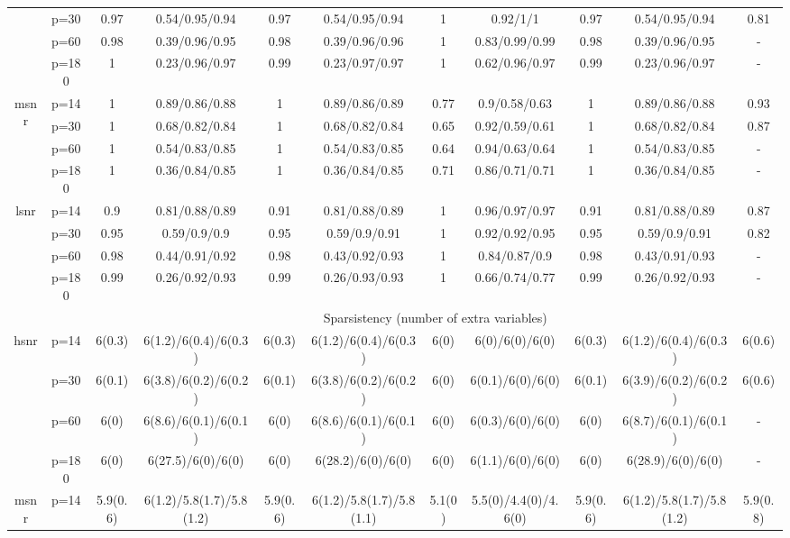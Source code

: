 \begin{table}[ht]
{\begin{tabular}{|c|c|cc|cc|cc|cc|c|}
   & p=30 & 0.97 & 0.54/0.95/0.94 & 0.97 & 0.54/0.95/0.94 & 1 & 0.92/1/1 & 0.97 & 0.54/0.95/0.94 & 0.81 \\ 
   & p=60 & 0.98 & 0.39/0.96/0.95 & 0.98 & 0.39/0.96/0.96 & 1 & 0.83/0.99/0.99 & 0.98 & 0.39/0.96/0.95 & - \\ 
   & p=180 & 1 & 0.23/0.96/0.97 & 0.99 & 0.23/0.97/0.97 & 1 & 0.62/0.96/0.97 & 0.99 & 0.23/0.96/0.97 & - \\ 
  \midrule\multirow{4}[2]{*}{msnr} & p=14 & 1 & 0.89/0.86/0.88 & 1 & 0.89/0.86/0.89 & 0.77 & 0.9/0.58/0.63 & 1 & 0.89/0.86/0.88 & 0.93 \\ 
   & p=30 & 1 & 0.68/0.82/0.84 & 1 & 0.68/0.82/0.84 & 0.65 & 0.92/0.59/0.61 & 1 & 0.68/0.82/0.84 & 0.87 \\ 
   & p=60 & 1 & 0.54/0.83/0.85 & 1 & 0.54/0.83/0.85 & 0.64 & 0.94/0.63/0.64 & 1 & 0.54/0.83/0.85 & - \\ 
   & p=180 & 1 & 0.36/0.84/0.85 & 1 & 0.36/0.84/0.85 & 0.71 & 0.86/0.71/0.71 & 1 & 0.36/0.84/0.85 & - \\ 
  \midrule\multirow{4}[2]{*}{lsnr} & p=14 & 0.9 & 0.81/0.88/0.89 & 0.91 & 0.81/0.88/0.89 & 1 & 0.96/0.97/0.97 & 0.91 & 0.81/0.88/0.89 & 0.87 \\ 
   & p=30 & 0.95 & 0.59/0.9/0.9 & 0.95 & 0.59/0.9/0.91 & 1 & 0.92/0.92/0.95 & 0.95 & 0.59/0.9/0.91 & 0.82 \\ 
   & p=60 & 0.98 & 0.44/0.91/0.92 & 0.98 & 0.43/0.92/0.93 & 1 & 0.84/0.87/0.9 & 0.98 & 0.43/0.91/0.93 & - \\ 
   & p=180 & 0.99 & 0.26/0.92/0.93 & 0.99 & 0.26/0.93/0.93 & 1 & 0.66/0.74/0.77 & 0.99 & 0.26/0.92/0.93 & - \\ 
   \midrule 
 \multicolumn{1}{|c}{} &       & \multicolumn{9}{c|}{Sparsistency (number of extra variables)} \\
\midrule\multirow{4}[2]{*}{hsnr} & p=14 & 6(0.3) & 6(1.2)/6(0.4)/6(0.3) & 6(0.3) & 6(1.2)/6(0.4)/6(0.3) & 6(0) & 6(0)/6(0)/6(0) & 6(0.3) & 6(1.2)/6(0.4)/6(0.3) & 6(0.6) \\ 
   & p=30 & 6(0.1) & 6(3.8)/6(0.2)/6(0.2) & 6(0.1) & 6(3.8)/6(0.2)/6(0.2) & 6(0) & 6(0.1)/6(0)/6(0) & 6(0.1) & 6(3.9)/6(0.2)/6(0.2) & 6(0.6) \\ 
   & p=60 & 6(0) & 6(8.6)/6(0.1)/6(0.1) & 6(0) & 6(8.6)/6(0.1)/6(0.1) & 6(0) & 6(0.3)/6(0)/6(0) & 6(0) & 6(8.7)/6(0.1)/6(0.1) & - \\ 
   & p=180 & 6(0) & 6(27.5)/6(0)/6(0) & 6(0) & 6(28.2)/6(0)/6(0) & 6(0) & 6(1.1)/6(0)/6(0) & 6(0) & 6(28.9)/6(0)/6(0) & - \\ 
  \midrule\multirow{4}[2]{*}{msnr} & p=14 & 5.9(0.6) & 6(1.2)/5.8(1.7)/5.8(1.2) & 5.9(0.6) & 6(1.2)/5.8(1.7)/5.8(1.1) & 5.1(0) & 5.5(0)/4.4(0)/4.6(0) & 5.9(0.6) & 6(1.2)/5.8(1.7)/5.8(1.2) & 5.9(0.8) \\ 

\end{tabular}}
\end{table}
